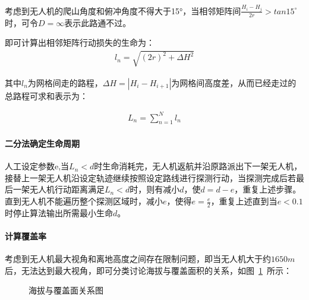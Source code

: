 \documentclass{whutmod}
\begin{document}
	考虑到无人机的爬山角度和俯冲角度不得大于15°，当相邻矩阵间$\frac{H_{i}-H_{j}}{2r}>tan15^{\circ}$时，可令$D=\infty$表示此路通不过。

	即可计算出相邻矩阵行动损失的生命为：
	\begin{gather*}
		l_{n}=\sqrt{(2r)^{2}+\Delta H^{2}}
	\end{gather*}

	其中$l_{n}$为网格间走的路程，$\Delta H=\left | H_{i}-H_{i+1} \right |$为网格间高度差，从而已经走过的总路程可求和表示为：
	
	\begin{gather}
	L_{n}=\sum_{n=1}^{N}l_{n}
	\end{gather}

		\paragraph{二分法确定生命周期}人工设定参数e,当$L_{n}<d$时生命消耗完，无人机返航并沿原路派出下一架无人机，接替上一架无人机沿设定轨迹继续按照设定路线进行探测行动，当探测完成后若最后一架无人机行动距离满足$L_{n}<d$时，则有减小$d$，使$d=d-e$，重复上述步骤。直到无人机不能遍历整个探测区域时，减小$e$，使得$e=\frac{e}{2}$，重复上述直到当$e<0.1$时停止算法输出所需最小生命$d$。
	
	\paragraph{计算覆盖率}
	考虑到无人机最大视角和离地高度之间存在限制问题，即当无人机大于约$1650m$后，无法达到最大视角，即可分类讨论海拔与覆盖面积的关系，如图~\ref{fugailv}~所示：
	
		\begin{figure}[H]
		\centering
		\quad
		\caption{海拔与覆盖面关系图}\label{fugailv}
	\end{figure}
	
\end{document}
